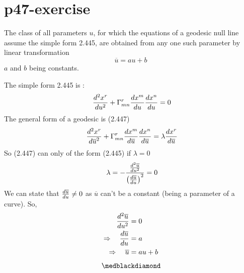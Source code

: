 \section{p47-exercise }
\begin{tcolorbox}
The class of all parameters $u$, for which the equations of a geodesic null line assume the simple form 2.445, are obtained from any one such parameter by linear transformation $$ \overline{u} = au + b$$ $a$ and $b$ being constants.
\end{tcolorbox}
The simple form 2.445 is :
\begin{align}
\  \dv[2]{x^r}{u} +\Gamma^r_{mn}\dv{x^m}{u}\dv{x^n}{u} = 0\\
\end{align}
The general form of a geodesic is (2.447) 
\begin{align}
\  \dv[2]{x^r}{\overline{u}} +\Gamma^r_{mn}\dv{x^m}{\overline{u}}\dv{x^n}{\overline{u}} = \lambda \dv{x^r}{\overline{u}}\\
\end{align}
So (2.447) can only of the form (2.445) if $\lambda = 0$
\begin{align}
\   \lambda  = - \frac{\dv[2]{\overline{u}}{u}}{\left( \dv{\overline{u}}{u}\right)^2} = 0\\
\end{align}
We can state that $\dv{\overline{u}}{u}\ne 0$ as $\overline{u}$ can't be a constant (being a parameter of a curve). So,
\begin{align}
\dv[2]{\overline{u}}{u}&=0\\
\Rightarrow \quad \dv{\overline{u}}{u}&=a\\
\Rightarrow \quad \overline{u}&=au +b
\end{align}
$$\medblackdiamond$$
\newpage


